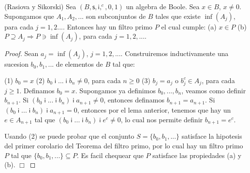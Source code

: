   \begin{theorem}
    (Rasiova y Sikorski) Sea \((B,\mathsf{s},\mathsf{i},^{c},0,1)\) un algebra de Boole. Sea \(x\in B\), \(x\neq 0\). Supongamos que \(A_{1},A_{2},...\) son subconjuntos de \(B\) tales que existe \(\inf (A_{j})\), para cada \(j=1,2....\) Entonces hay un filtro primo \(P\) el cual cumple:
    (a) \(x\in P\)
    (b) \(P\supseteq A_{j}\Rightarrow P\ni \inf (A_{j})\), para cada \( j=1,2,....\)
  \end{theorem}
  \begin{proof}
    Sean \(a_{j}=\inf (A_{j})\), \(j=1,2,...\). Construiremos inductivamente una sucesion \(b_{0},b_{1},...\) de elementos de \(B\) tal que:

    (1) \(b_{0}=x\)
    (2) \(b_{0}\;\mathsf{i\;}\)...\(\;\mathsf{i\;}b_{n}\neq 0\), para cada \( n\geq 0\)
    (3) \(b_{j}=a_{j}\) o \(b_{j}^{c}\in A_{j}\), para cada \(j\geq 1\).
    Definamos \(b_{0}=x\). Supongamos ya definimos \(b_{0},...,b_{n}\), veamos como definir \(b_{n+1}\). Si \((b_{0}\;\mathsf{i\;}...\;\mathsf{i\;} b_{n})\;\mathsf{i\;}a_{n+1}\neq 0\), entonces definamos \(b_{n+1}=a_{n+1}\). Si \((b_{0}\;\mathsf{i\;}...\;\mathsf{i\;}b_{n})\;\mathsf{i\;}a_{n+1}=0\), entonces por el lema anterior, tenemos que hay un \(e\in A_{n+1}\) tal que \( (b_{0}\;\mathsf{i\;}...\;\mathsf{i\;}b_{n})\;\mathsf{i\;}e^{c}\neq 0\), lo cual nos permite definir \(b_{n+1}=e^{c}\).

    Usando (2) se puede probar que el conjunto \(S=\{b_{0},b_{1},...\}\) satisface la hipotesis del primer corolario del Teorema del filtro primo, por lo cual hay un filtro primo \(P\) tal que \(\{b_{0},b_{1},...\}\subseteq P\). Es facil chequear que \(P\) satisface las propiedades (a) y (b). \(\Box\)
  \end{proof}

